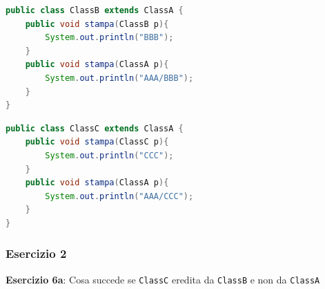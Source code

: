 \documentclass{article}
\begin{document}
\begin{lstlisting}[language=Java,escapechar=|]
public class ClassB extends ClassA {
	public void stampa(ClassB p){
		System.out.println("BBB");
	}
	public void stampa(ClassA p){
		System.out.println("AAA/BBB");
	}
}
\end{lstlisting}

\begin{lstlisting}[language=Java,escapechar=|]
public class ClassC extends ClassA {
	public void stampa(ClassC p){
		System.out.println("CCC");
	}
	public void stampa(ClassA p){
		System.out.println("AAA/CCC");
	}
}
\end{lstlisting}

\subsubsection{Esercizio 2}
\begin{framed}
\textbf{Esercizio 6a}: Cosa succede se \texttt{ClassC} eredita da \texttt{ClassB} e non da \texttt{ClassA}
\end{framed}
\end{document}
